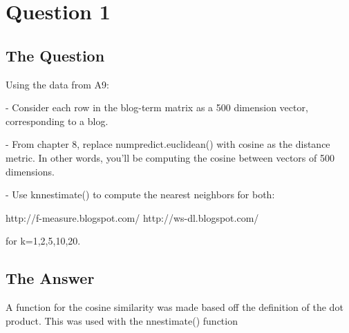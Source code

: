 \section{Question 1}

\subsection{The Question}

\begin{flushleft}

Using the data from A9:

- Consider each row in the blog-term matrix as a 500 dimension vector, 
corresponding to a blog.  

- From chapter 8, replace numpredict.euclidean() with cosine as the 
distance metric.  In other words, you'll be computing the cosine between
vectors of 500 dimensions.  

- Use knnestimate() to compute the nearest neighbors for both:

http://f-measure.blogspot.com/
http://ws-dl.blogspot.com/

for k={1,2,5,10,20}.

\end{flushleft}


\subsection{The Answer}
A function for the cosine similarity was made based off the definition of the dot product. This was used with the nnestimate() function





